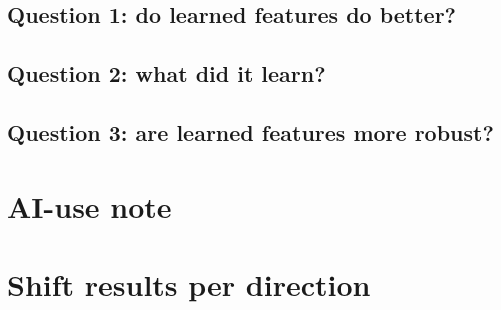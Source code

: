 \subsection{Question 1: do learned features do better?}

\subsection{Question 2: what did it learn?}

\subsection{Question 3: are learned features more robust?}

\section{AI-use note}

\appendix

\section{Shift results per direction}

\begin{table}[H]
  \centering
  \caption{Test accuracy for each shift direction separately.}
  \label{tab:s3-shift-directions}
  
\end{table}
